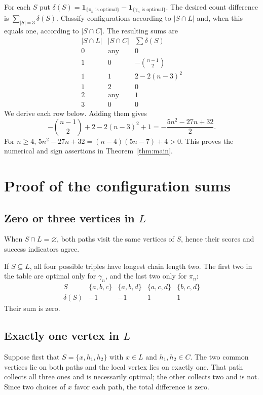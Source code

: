 \documentclass[11pt,a4paper]{article}
\begin{document}
For each $S$ put
$\delta(S)=\mathbf 1_{\{\pi_n\text{ is optimal}\}}
             -\mathbf 1_{\{\gamma_n\text{ is optimal}\}}$.
The desired count difference is $\sum_{|S|=3}\delta(S)$.
Classify configurations according to $|S\cap L|$ and, when this equals
one, according to $|S\cap C|$. The resulting sums are
\[
\begin{array}{c|c|r}
 |S\cap L| & |S\cap C| & \sum\delta(S)\\ \hline
 0&\text{any}&0\\
 1&0&-\binom{n-1}{2}\\
 1&1&2-2(n-3)^2\\
 1&2&0\\
 2&\text{any}&1\\
 3&0&0
\end{array}
\tag{2.1}\label{eq:table}
\]
We derive each row below. Adding them gives
\[
 -\binom{n-1}{2}+2-2(n-3)^2+1
 =-\frac{5n^2-27n+32}{2}.
\]
For $n\ge4$, $5n^2-27n+32=(n-4)(5n-7)+4>0$.
This proves the numerical and sign assertions in Theorem~\ref{thm:main}.

\section{Proof of the configuration sums}
\subsection{Zero or three vertices in \texorpdfstring{$L$}{L}}
When $S\cap L=\varnothing$, both paths visit the same vertices of $S$,
hence their scores and success indicators agree.

If $S\subseteq L$, all four possible triples have longest chain length
two. The first two in the table are optimal only for $\gamma_n$, and
the last two only for $\pi_n$:
\[
\begin{array}{c|rrrr}
 S&\{a,b,c\}&\{a,b,d\}&\{a,c,d\}&\{b,c,d\}\\ \hline
 \delta(S)&-1&-1&1&1
\end{array}
\]
Their sum is zero.

\subsection{Exactly one vertex in \texorpdfstring{$L$}{L}}
Suppose first that $S=\{x,h_1,h_2\}$ with $x\in L$ and
$h_1,h_2\in C$. The two common vertices lie on both paths and the
local vertex lies on exactly one. That path collects all three ones
and is necessarily optimal; the other collects two and is not.
Since two choices of $x$ favor each path, the total difference is zero.
\end{document}

